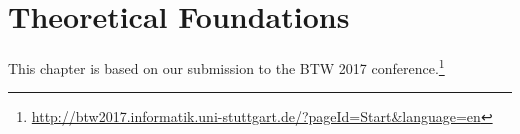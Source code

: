 \chapter{Theoretical Foundations}
\label{chp:foundations}

This chapter is based on our submission to the BTW 2017 conference.\footnote{\url{http://btw2017.informatik.uni-stuttgart.de/?pageId=Start&language=en}}

\graphicspath{{./figures/}}
















